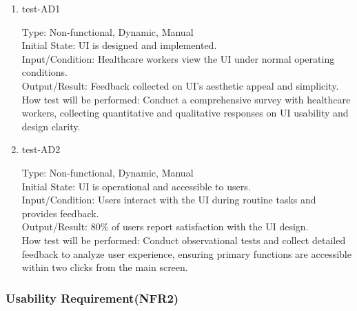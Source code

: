 \documentclass[12pt, titlepage]{article}
\begin{document}
\begin{enumerate}
    \item{test-AD1\\} \label{test-AD1}
    
    Type: Non-functional, Dynamic, Manual\\
    
    Initial State: UI is designed and implemented.\\
    
    Input/Condition: Healthcare workers view the UI under normal operating conditions.\\
    
    Output/Result: Feedback collected on UI’s aesthetic appeal and simplicity.\\
    
    How test will be performed: Conduct a comprehensive survey with healthcare workers, collecting quantitative and qualitative responses on UI usability and design clarity.

    \item{test-AD2\\} \label{test-AD2}
    
    Type: Non-functional, Dynamic, Manual\\
    
    Initial State: UI is operational and accessible to users.\\
    
    Input/Condition: Users interact with the UI during routine tasks and provides feedback.\\
    
    Output/Result: 80\% of users report satisfaction with the UI design.\\
    
    How test will be performed: Conduct observational tests and collect detailed feedback to analyze user experience, ensuring primary functions are accessible within two clicks from the main screen. 
\end{enumerate}

\subsubsection{Usability Requirement(NFR2)} \label{section:4.2.2}
\end{document}

